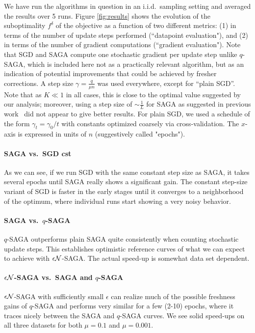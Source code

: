 We have run the algorithms in question in an i.i.d.~sampling setting and averaged the results over 5 runs. Figure \ref{fig:results} shows the  evolution of the suboptimality $f^\delta$ of the objective as a function of two different metrics: (1) in terms of the number of update steps performed (``datapoint evaluation"), and (2) in terms of the number of gradient computations (``gradient evaluation"). Note that SGD and SAGA compute one stochastic gradient per update step unlike $q$-SAGA, which is included here not as a practically relevant algorithm, but as an indication of potential improvements that could be achieved by fresher corrections. A step size $\gamma=\frac {q}{\mu n}$ was used everywhere, except for ``plain SGD''. Note that as $K \ll 1$ in all cases, this is close to the optimal value suggested by our analysis; moreover, using a step size of $\sim \frac{1}{L}$ for SAGA as suggested in previous work~\cite{schmidt2013minimizing} did not appear to give better results. For plain SGD, we used a schedule of the form $\gamma_t = \gamma_0/t$ with constants optimized coarsely via cross-validation. The $x$-axis is expressed in units of $n$ (suggestively called "epochs"). 

\vspace{-1.3mm}
\paragraph{SAGA vs.~SGD cst}  As we can see, if we run SGD with the same constant step size as SAGA, it takes several epochs until SAGA really shows a significant gain. The constant step-size variant of SGD is faster in the early stages until it converges to a neighborhood of the optimum, where individual runs start showing a very noisy behavior. 

\vspace{-1.3mm}
\paragraph{SAGA vs.~$q$-SAGA} 
$q$-SAGA outperforms plain SAGA quite consistently when counting stochastic update steps. This establishes optimistic reference curves of what we can expect to achieve with $\epsilon {\cal N}$-SAGA. The actual  speed-up is somewhat data set dependent.  

\vspace{-1.3mm}
\paragraph{$\epsilon{\cal N}$-SAGA vs.~SAGA and $q$-SAGA} $\epsilon {\cal N}$-SAGA with sufficiently small $\epsilon$ can realize much of the possible freshness gains of $q$-SAGA and performs very similar for a few (2-10) epochs, where it traces nicely between the SAGA and $q$-SAGA curves. We see solid speed-ups on all three datasets for both $\mu=0.1$ and $\mu=0.001$. 

